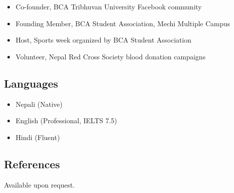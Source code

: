 \begin{itemize}
\tightlist
\item
  Co-founder, BCA Tribhuvan University Facebook community
\item
  Founding Member, BCA Student Association, Mechi Multiple Campus
\item
  Host, Sports week organized by BCA Student Association
\item
  Volunteer, Nepal Red Cross Society blood donation campaigns
\end{itemize}

\hypertarget{languages}{%
\subsection{\texorpdfstring{\textbf{Languages}}{Languages}}\label{languages}}

\begin{itemize}
\tightlist
\item
  Nepali (Native)
\item
  English (Professional, IELTS 7.5)
\item
  Hindi (Fluent)
\end{itemize}

\hypertarget{references}{%
\subsection{\texorpdfstring{\textbf{References}}{References}}\label{references}}

Available upon request.
